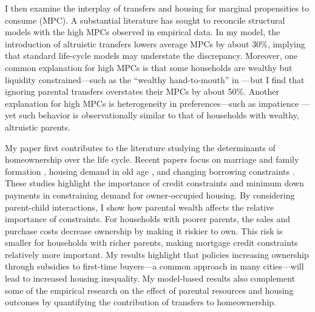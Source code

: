 \documentclass[12pt]{article}
\begin{document}
I then examine the interplay  of transfers and housing for marginal propensities to consume (MPC). A substantial literature has sought to reconcile structural models with the high MPCs observed in empirical data.  In my model, the introduction of altruistic transfers lowers average MPCs by about 30\%, implying that standard life-cycle models may understate the discrepancy.  Moreover, one common explanation for high MPCs is that some households are wealthy but liquidity constrained---such as the ``wealthy hand-to-mouth'' in \cite{kaplan2022marginal}---but I find that ignoring parental transfers overstates their MPCs by about 50\%. Another explanation for high MPCs is heterogeneity in preferences---such as impatience \citep[e.g.,][]{aguiar2024hand}---yet such behavior is observationally similar to that of households with wealthy, altruistic parents.



My paper first contributes to the literature studying the determinants of homeownership over the life cycle. Recent papers focus on marriage and family formation \citep{Fisher2011,Chang2024,Khorunzhina2019}, housing demand in old age \citep{McGee2019,Barczyk2020a}, and changing borrowing constraints \citep{Paz-Pardo2019,Mabille2020}. These studies highlight the importance of credit constraints and minimum down payments in constraining demand for owner-occupied housing. By considering parent-child interactions, I show how parental wealth affects the relative importance of constraints. For households with poorer parents, the sales and purchase costs decrease ownership by making it riskier to own. This risk is smaller for households with richer parents, making mortgage credit constraints relatively more important. My results highlight that policies increasing ownership through subsidies to first-time buyers---a common approach in many cities---will lead to increased housing inequality. My model-based results also complement some of the empirical research on the effect of parental resources and housing outcomes \citep[see e.g.,][ for recent work]{wold2024housing,daysal2023intergenerational,benetton2022dynastic} by quantifying the contribution of transfers to homeownership.
\end{document}
